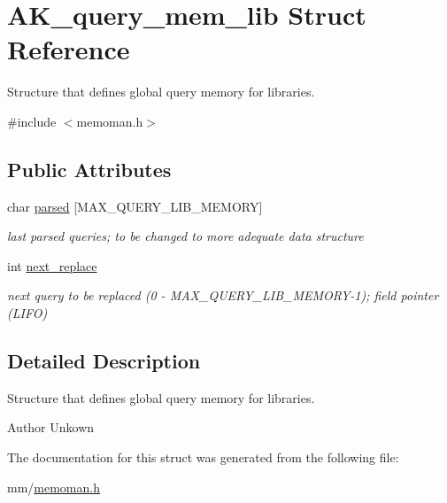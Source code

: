 \hypertarget{structAK__query__mem__lib}{\section{A\+K\+\_\+query\+\_\+mem\+\_\+lib Struct Reference}
\label{structAK__query__mem__lib}
}


Structure that defines global query memory for libraries.  




{\ttfamily \#include $<$memoman.\+h$>$}

\subsection*{Public Attributes}
\begin{DoxyCompactItemize}
\item 
\hypertarget{structAK__query__mem__lib_ad9f1f83f9132d56bfe652891b303f73a}{char \hyperlink{structAK__query__mem__lib_ad9f1f83f9132d56bfe652891b303f73a}{parsed} \mbox{[}M\+A\+X\+\_\+\+Q\+U\+E\+R\+Y\+\_\+\+L\+I\+B\+\_\+\+M\+E\+M\+O\+R\+Y\mbox{]}}\label{structAK__query__mem__lib_ad9f1f83f9132d56bfe652891b303f73a}

\begin{DoxyCompactList}\small\item\em last parsed queries; to be changed to more adequate data structure \end{DoxyCompactList}\item 
\hypertarget{structAK__query__mem__lib_ab7a0a03ba936eabe2a9a11c74fa0d385}{int \hyperlink{structAK__query__mem__lib_ab7a0a03ba936eabe2a9a11c74fa0d385}{next\+\_\+replace}}\label{structAK__query__mem__lib_ab7a0a03ba936eabe2a9a11c74fa0d385}

\begin{DoxyCompactList}\small\item\em next query to be replaced (0 -\/ M\+A\+X\+\_\+\+Q\+U\+E\+R\+Y\+\_\+\+L\+I\+B\+\_\+\+M\+E\+M\+O\+R\+Y-\/1); field pointer (L\+I\+F\+O) \end{DoxyCompactList}\end{DoxyCompactItemize}


\subsection{Detailed Description}
Structure that defines global query memory for libraries. 

\begin{DoxyAuthor}{Author}
Unkown 
\end{DoxyAuthor}


The documentation for this struct was generated from the following file\+:\begin{DoxyCompactItemize}
\item 
mm/\hyperlink{memoman_8h}{memoman.\+h}\end{DoxyCompactItemize}

